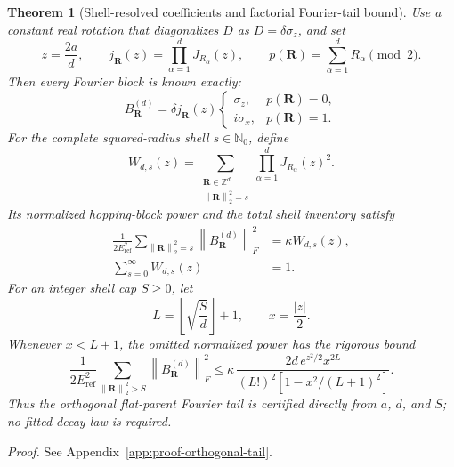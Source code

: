 \documentclass[11pt]{article}
\newcommand{\norm}[1]{\left\lVert #1\right\rVert}
\newtheorem{theorem}{Theorem}[section]
\begin{document}
\begin{theorem}[Shell-resolved coefficients and factorial Fourier-tail bound]
\label{thm:orthogonal-fourier-tail}
Use a constant real rotation that diagonalizes $D$ as
$D=\delta\sigma_z$, and set
\begin{equation}
 z=\frac{2a}{d},\qquad
 j_{\mathbf R}(z)=\prod_{\alpha=1}^d J_{R_\alpha}(z),\qquad
 p(\mathbf R)=\sum_{\alpha=1}^dR_\alpha\pmod 2.
\end{equation}
Then every Fourier block is known exactly:
\begin{equation}
 B_{\mathbf R}^{(d)}
 =\delta j_{\mathbf R}(z)
 \begin{cases}
  \sigma_z,&p(\mathbf R)=0,\\
  i\sigma_x,&p(\mathbf R)=1.
 \end{cases}
 \label{eq:orthogonal-fourier-block}
\end{equation}
For the complete squared-radius shell $s\in\mathbb N_0$, define
\begin{equation}
 W_{d,s}(z)=
 \sum_{\substack{\mathbf R\in\mathbb Z^d\\\norm{\mathbf R}_2^2=s}}
 \prod_{\alpha=1}^dJ_{R_\alpha}(z)^2.
 \label{eq:shell-weight}
\end{equation}
Its normalized hopping-block power and the total shell inventory satisfy
\begin{align}
 \frac{1}{2E_{\mathrm{ref}}^2}
 \sum_{\norm{\mathbf R}_2^2=s}\norm{B_{\mathbf R}^{(d)}}_F^2
 &=\kappa W_{d,s}(z),
 \label{eq:shell-power}\\
 \sum_{s=0}^{\infty}W_{d,s}(z)&=1.
 \label{eq:shell-partition}
\end{align}
For an integer shell cap $S\ge0$, let
\begin{equation}
 L=\left\lfloor\sqrt{\frac{S}{d}}\right\rfloor+1,
 \qquad x=\frac{|z|}{2}.
\end{equation}
Whenever $x<L+1$, the omitted normalized power has the rigorous bound
\begin{equation}
 \frac{1}{2E_{\mathrm{ref}}^2}
 \sum_{\norm{\mathbf R}_2^2>S}\norm{B_{\mathbf R}^{(d)}}_F^2
 \le
 \kappa\,
 \frac{2d\,e^{z^2/2}x^{2L}}
 {(L!)^2\left[1-x^2/(L+1)^2\right]}.
 \label{eq:orthogonal-factorial-tail}
\end{equation}
Thus the orthogonal flat-parent Fourier tail is certified directly from $a$, $d$, and
$S$; no fitted decay law is required.
\end{theorem}

\noindent\emph{Proof.} See Appendix~\ref{app:proof-orthogonal-tail}.
\end{document}
